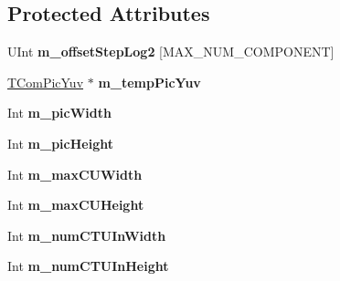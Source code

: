 \subsection*{Protected Attributes}
\begin{DoxyCompactItemize}
\item 
\mbox{\label{class_t_com_sample_adaptive_offset_a8216941241780bc490595ad42c6064c4}} 
U\+Int {\bfseries m\+\_\+offset\+Step\+Log2} \mbox{[}M\+A\+X\+\_\+\+N\+U\+M\+\_\+\+C\+O\+M\+P\+O\+N\+E\+NT\mbox{]}
\item 
\mbox{\label{class_t_com_sample_adaptive_offset_a19821b82b503165acb0c544f78b72f39}} 
\hyperlink{class_t_com_pic_yuv}{T\+Com\+Pic\+Yuv} $\ast$ {\bfseries m\+\_\+temp\+Pic\+Yuv}
\item 
\mbox{\label{class_t_com_sample_adaptive_offset_aca300c001ee4f4630bde022d1f1c564b}} 
Int {\bfseries m\+\_\+pic\+Width}
\item 
\mbox{\label{class_t_com_sample_adaptive_offset_a9ee9664e8d820f1a7e90d72ea10631db}} 
Int {\bfseries m\+\_\+pic\+Height}
\item 
\mbox{\label{class_t_com_sample_adaptive_offset_a5a88dab2978c70121b14af28b438192e}} 
Int {\bfseries m\+\_\+max\+C\+U\+Width}
\item 
\mbox{\label{class_t_com_sample_adaptive_offset_a856ea4fcdd09457e3e4351472e092666}} 
Int {\bfseries m\+\_\+max\+C\+U\+Height}
\item 
\mbox{\label{class_t_com_sample_adaptive_offset_a7eb84e460535ef20473da84a8333d6f7}} 
Int {\bfseries m\+\_\+num\+C\+T\+U\+In\+Width}
\item 
\mbox{\label{class_t_com_sample_adaptive_offset_aaa8573ed657a29c9766970ed20a159ef}} 
Int {\bfseries m\+\_\+num\+C\+T\+U\+In\+Height}
\item 
\mbox{\label{class_t_com_sample_adaptive_offset_af6c5e8b4646a047216313f0991a5b741}} 

\end{DoxyCompactItemize}
